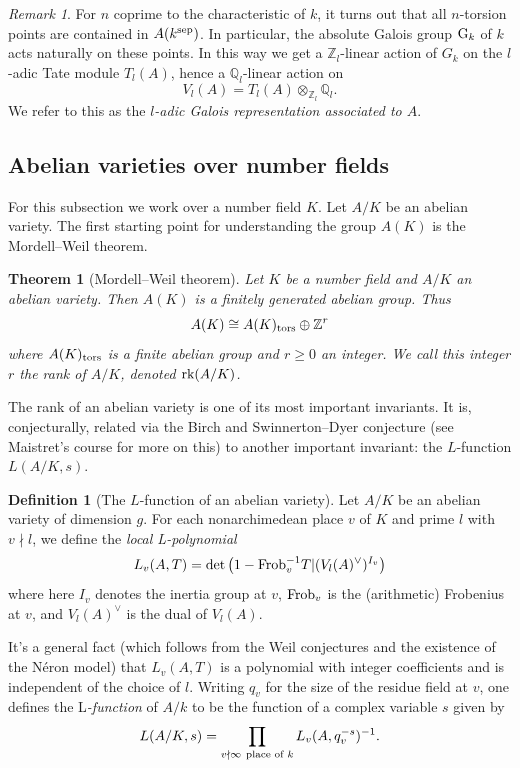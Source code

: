 \documentclass[12pt]{amsart}
\numberwithin{equation}{section}
\newtheorem{theorem}[equation]{Theorem}
\theoremstyle{remark}
\newtheorem{remark}[equation]{Remark}
\theoremstyle{definition}
\theoremstyle{definition}
\theoremstyle{definition}
\newtheorem{defi}[equation]{Definition}
\theoremstyle{definition}
\theoremstyle{definition}
\theoremstyle{definition}
\begin{document}
\begin{remark}
For $n$ coprime to the characteristic of $k$, it turns out that all $n$-torsion points are contained in $A(k^\textup{sep})$. In particular, the absolute Galois group $\textup{G}_k$ of $k$ acts naturally on these points. In this way we get a $\mathbb{Z}_l$-linear action of $G_k$ on the $l$-adic Tate module $T_l(A)$, hence a $\mathbb{Q}_l$-linear action on 
\[V_l(A)=T_l(A)\otimes_{\mathbb{Z}_l}\mathbb{Q}_l.\]
We refer to this as the \textit{$l$-adic Galois representation associated to $A$}. %
\end{remark}


\subsection{Abelian varieties over number fields}

For this subsection we work over a number field $K$. Let $A/K$ be an abelian variety. The first starting point for understanding the group $A(K)$ is the Mordell--Weil theorem.

\begin{theorem}[Mordell--Weil theorem]
Let $K$ be a number field and $A/K$  an abelian variety. Then $A(K)$ is a finitely generated abelian group. Thus
\[A(K)\cong A(K)_{\textup{tors}}\oplus \mathbb{Z}^r\]
where $A(K)_{\textup{tors}}$ is a finite abelian group and $r\geq 0$ an integer. We call this integer $r$ the \emph{rank} of $A/K$, denoted $\textup{rk}(A/K)$.
\end{theorem}

The rank of an abelian variety is one of its most important invariants. It is, conjecturally, related via the Birch and Swinnerton--Dyer conjecture (see Maistret's course for more on this) to another important invariant: the $L$-function $L(A/K,s)$. 

\begin{defi}[The $L$-function of an abelian variety]
Let $A/K$ be an abelian variety of dimension $g$. For each nonarchimedean place $v$ of $K$ and prime $l$ with $v\nmid l$, we define the \textit{local L-polynomial}
\[L_v(A,T)=\det\left(1-\textup{Frob}_v^{-1}T|(V_l(A)^\vee)^{I_v}\right)\]
where here $I_v$ denotes the inertia group at $v$,  $\textup{Frob}_v$ is the (arithmetic) Frobenius at $v$, and $V_l(A)^{\vee}$ is the dual of $V_l(A)$. 

It's a general fact (which follows from the Weil conjectures and the existence of the N\'{e}ron model) that $L_v(A,T)$ is a polynomial with integer coefficients and is independent of the choice of $l$.  Writing $q_v$ for the size of the residue field at $v$, one defines the L\textit{-function} of $A/k$ to be the function of a complex variable $s$ given by
\[L(A/K,s)=\prod_{v\nmid \infty~\textup{place of }k}L_v(A,q_v^{-s})^{-1}.\]
\end{defi}
\end{document}
